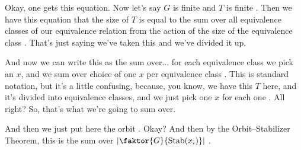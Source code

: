 \begin{speech}[00:39:58 - 00:41:39]
Okay, one gets this equation. Now let's say $G$ is finite and $T$ is finite . Then we have this equation that the size of $T$ is equal to the sum over all equivalence classes of our equivalence relation from the action of the size of the equivalence class . That's just saying we've taken this and we've divided it up.

And now we can write this as the sum over... for each equivalence class we pick an $x$, and we sum over choice of one $x$ per equivalence class . This is standard notation, but it's a little confusing, because, you know, we have this $T$ here, and it's divided into equivalence classes, and we just pick one $x$ for each one . All right? So, that's what we're going to sum over.

And then we just put here the orbit . Okay? And then by the Orbit--Stabilizer Theorem, this is the sum over $\left| \faktor{G}{\operatorname{Stab}(x_i)} \right|$ .
\end{speech}

